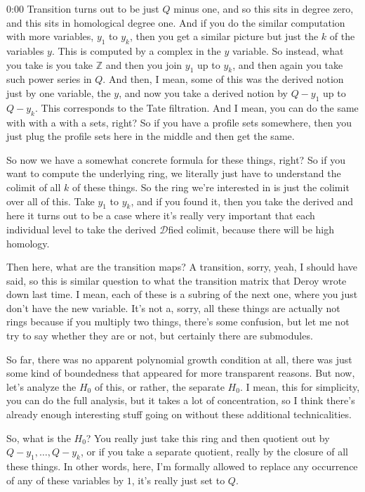\begin{unfinished}{0:00}
Transition turns out to be just $Q$ minus one, and so this sits in degree zero, and this sits in homological degree one. And if you do the similar computation with more variables, $y_1$ to $y_k$, then you get a similar picture but just the $k$ of the variables $y$. This is computed by a complex in the $y$ variable. So instead, what you take is you take $\mathbb{Z}$ and then you join $y_1$ up to $y_k$, and then again you take such power series in $Q$. And then, I mean, some of this was the derived notion just by one variable, the $y$, and now you take a derived notion by $Q - y_1$ up to $Q - y_k$. This corresponds to the Tate filtration. And I mean, you can do the same with with a with a sets, right? So if you have a profile sets somewhere, then you just plug the profile sets here in the middle and then get the same.

So now we have a somewhat concrete formula for these things, right? So if you want to compute the underlying ring, we literally just have to understand the colimit of all $k$ of these things. So the ring we're interested in is just the colimit over all of this. Take $y_1$ to $y_k$, and if you found it, then you take the derived and here it turns out to be a case where it's really very important that each individual level to take the derived $\mathcal{D}$fied colimit, because there will be high homology.

Then here, what are the transition maps? A transition, sorry, yeah, I should have said, so this is similar question to what the transition matrix that Deroy wrote down last time. I mean, each of these is a subring of the next one, where you just don't have the new variable. It's not a, sorry, all these things are actually not rings because if you multiply two things, there's some confusion, but let me not try to say whether they are or not, but certainly there are submodules.

So far, there was no apparent polynomial growth condition at all, there was just some kind of boundedness that appeared for more transparent reasons. But now, let's analyze the $H_0$ of this, or rather, the separate $H_0$. I mean, this for simplicity, you can do the full analysis, but it takes a lot of concentration, so I think there's already enough interesting stuff going on without these additional technicalities.

So, what is the $H_0$? You really just take this ring and then quotient out by $Q - y_1, \dots, Q - y_k$, or if you take a separate quotient, really by the closure of all these things. In other words, here, I'm formally allowed to replace any occurrence of any of these variables by $1$, it's really just set to $Q$.


\end{unfinished}
